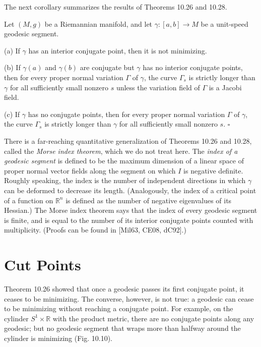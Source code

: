 The next corollary summarizes the results of Theorems 10.26 and 10.28.

\begin{corollary}\label{cor:conjugate-point-not-minimizing}

Let $(M,g)$ be a Riemannian manifold, and let $\gamma : [a,b] \to M$ be a unit-speed geodesic segment.

(a) If $\gamma$ has an interior conjugate point, then it is not minimizing.

(b) If $\gamma(a)$ and $\gamma(b)$ are conjugate but $\gamma$ has no interior conjugate points, then for every proper normal variation $\Gamma$ of $\gamma$, the curve $\Gamma_s$ is strictly longer than $\gamma$ for all sufficiently small nonzero $s$ unless the variation field of $\Gamma$ is a Jacobi field.

(c) If $\gamma$ has no conjugate points, then for every proper normal variation $\Gamma$ of $\gamma$, the curve $\Gamma_s$ is strictly longer than $\gamma$ for all sufficiently small nonzero $s$. $\square$
\end{corollary}


There is a far-reaching quantitative generalization of Theorems 10.26 and 10.28, called the \emph{Morse index theorem}, which we do not treat here. The \emph{index of a geodesic segment} is defined to be the maximum dimension of a linear space of proper normal vector fields along the segment on which $I$ is negative definite. Roughly speaking, the index is the number of independent directions in which $\gamma$ can be deformed to decrease its length. (Analogously, the index of a critical point of a function on $\mathbb{R}^n$ is defined as the number of negative eigenvalues of its Hessian.) The Morse index theorem says that the index of every geodesic segment is finite, and is equal to the number of its interior conjugate points counted with multiplicity. (Proofs can be found in [Mil63, CE08, dC92].)

\section{Cut Points}

Theorem 10.26 showed that once a geodesic passes its first conjugate point, it ceases to be minimizing. The converse, however, is not true: a geodesic can cease to be minimizing without reaching a conjugate point. For example, on the cylinder $S^1 \times \mathbb{R}$ with the product metric, there are no conjugate points along any geodesic; but no geodesic segment that wraps more than halfway around the cylinder is minimizing (Fig. 10.10).

